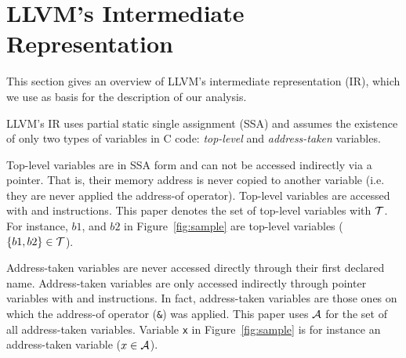 \section{LLVM's Intermediate Representation}\label{sec:llvm}

This section gives an overview of LLVM's intermediate
representation (IR), which we use as basis for the
description of our analysis.

LLVM's IR uses partial static single assignment (SSA)
and assumes the existence of only two types of variables
in C code: \textit{top-level} and \textit{address-taken}
variables.

Top-level variables are in SSA form and can not be
accessed indirectly via a pointer. That is, their memory
address is never copied to another variable (i.e. they are
never applied the address-of operator). Top-level variables
are accessed with \alloct and \copyt instructions.
This paper denotes the set of top-level variables
with $\mathcal{T}$. For instance, $b1$, and $b2$ in Figure~\ref{fig:sample}
are top-level variables ($\{b1, b2\} \in \mathcal{T}$).

Address-taken variables are never accessed directly through
their first declared name. Address-taken variables are only
accessed indirectly through pointer variables with \loadt and
\storet instructions. In fact, address-taken variables
are those ones on which the address-of operator (\texttt{\&})
was applied. This paper uses $\mathcal{A}$ for the set of all address-taken
variables. Variable \texttt{x} in Figure~\ref{fig:sample} is
for instance an address-taken variable ($x \in \mathcal{A}$).

\begin{comment}
We capture program elements using the following abstract
instructions:
\begin{itemize}
\item $\copydef$: copy instruction. $p, q \in \Aset$.
\item $\loaddef$: load instruction. $q \in \Aset$.
\item $\addrofdef$: address-of operator. $p \in \Aset, a \in \Pset$.
\item $\storedef$: store instruction. $p \in \Aset, q \in \Pset$.
\item $\sourcedef$: call to a taint source function. $r \in \Pset$
\item $\calldef$: call to a function. $r \in \Pset$
\item $\sinkdef$: call to sink function. $r \in \Pset$
\end{itemize}
\end{comment}
